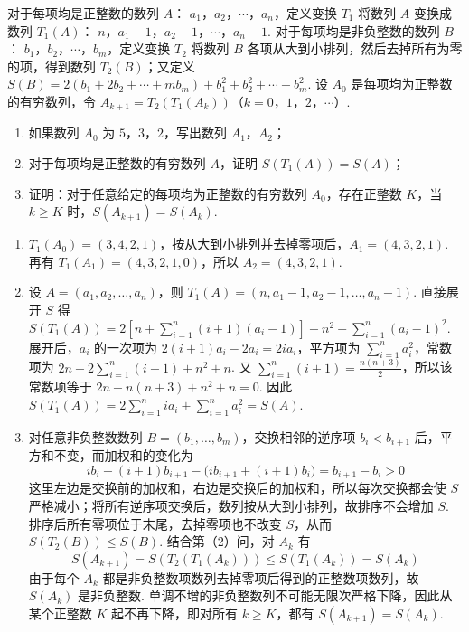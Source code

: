 \begin{problem}
对于每项均是正整数的数列 \(A\)： \(a_1\)，\(a_2\)，\(\cdots\)，\(a_n\)，定义变换 \(T_1\) 将数列 \(A\) 变换成数列 \(T_1\!\left(A\right)\)： \(n\)，\(a_1 - 1\)，\(a_2 - 1\)，\(\cdots\)，\(a_n - 1\). 对于每项均是非负整数的数列 \(B\)： \(b_1\)，\(b_2\)，\(\cdots\)，\(b_m\)，定义变换 \(T_2\) 将数列 \(B\) 各项从大到小排列，然后去掉所有为零的项，得到数列 \(T_2\!\left(B\right)\)；又定义 \(S\!\left(B\right) = 2(b_1 + 2b_2 + \cdots + mb_m) + b_1^2 + b_2^2 + \cdots + b_m^2\). 设 \(A_0\) 是每项均为正整数的有穷数列，令 \(A_{k+1} = T_2\!\left(T_1\!\left(A_k\right)\right)\)（\(k = 0\)，\(1\)，\(2\)，\(\cdots\)）.

\begin{enumerate}
\item 如果数列 \(A_0\) 为 \(5\)，\(3\)，\(2\)，写出数列 \(A_1\)，\(A_2\)；
\item 对于每项均是正整数的有穷数列 \(A\)，证明 \(S\!\left(T_1\!\left(A\right)\right) = S\!\left(A\right)\)；
\item 证明：对于任意给定的每项均为正整数的有穷数列 \(A_0\)，存在正整数 \(K\)，当 \(k \geqslant K\) 时，\(S(A_{k+1}) = S(A_k)\).
\end{enumerate}

\begin{solution}
\begin{enumerate}
\item \(T_1(A_0)=(3,4,2,1)\)，按从大到小排列并去掉零项后，\(A_1=(4,3,2,1)\). 再有 \(T_1(A_1)=(4,3,2,1,0)\)，所以 \(A_2=(4,3,2,1)\).
\item 设 \(A=(a_1,a_2,\ldots,a_n)\)，则 \(T_1(A)=(n,a_1-1,a_2-1,\ldots,a_n-1)\). 直接展开 \(S\) 得
\(S\left(T_1(A)\right)=2\left[n+\sum_{i=1}^{n}(i+1)(a_i-1)\right]+n^2+\sum_{i=1}^{n}(a_i-1)^2\).
展开后，\(a_i\) 的一次项为 \(2(i+1)a_i-2a_i=2ia_i\)，平方项为 \(\sum_{i=1}^n a_i^2\)，常数项为 \(2n-2\sum_{i=1}^{n}(i+1)+n^2+n\).
又 \(\sum_{i=1}^{n}(i+1)=\frac{n(n+3)}2\)，所以该常数项等于 \(2n-n(n+3)+n^2+n=0\). 因此 \(S\left(T_1(A)\right)=2\sum_{i=1}^{n}ia_i+\sum_{i=1}^{n}a_i^2=S(A)\).
\item 对任意非负整数数列 \(B=(b_1,\ldots,b_m)\)，交换相邻的逆序项 \(b_i<b_{i+1}\) 后，平方和不变，而加权和的变化为
\[
i b_i+(i+1)b_{i+1}-\bigl(i b_{i+1}+(i+1)b_i\bigr)=b_{i+1}-b_i>0
\]
这里左边是交换前的加权和，右边是交换后的加权和，所以每次交换都会使 \(S\) 严格减小；将所有逆序项交换后，数列按从大到小排列，故排序不会增加 \(S\). 排序后所有零项位于末尾，去掉零项也不改变 \(S\)，从而 \(S(T_2(B))\leqslant S(B)\). 结合第（2）问，对 \(A_k\) 有
\[
S(A_{k+1})=S\left(T_2(T_1(A_k))\right)\leqslant S\left(T_1(A_k)\right)=S(A_k)
\]
由于每个 \(A_k\) 都是非负整数项数列去掉零项后得到的正整数项数列，故 \(S(A_k)\) 是非负整数. 单调不增的非负整数列不可能无限次严格下降，因此从某个正整数 \(K\) 起不再下降，即对所有 \(k\geqslant K\)，都有 \(S(A_{k+1})=S(A_k)\).
\end{enumerate}
\end{solution}
\end{problem}
